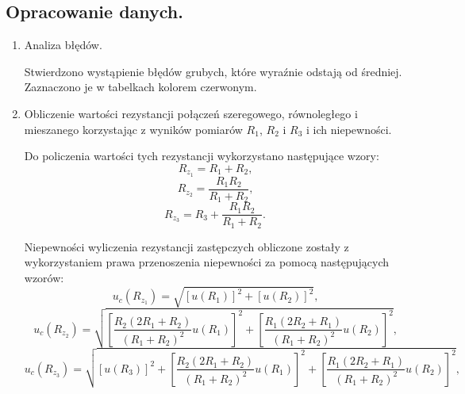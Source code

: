 \documentclass [a4paper,11pt]{article}
\begin{document}
	\subsection{Opracowanie danych.}\label{sec:drm}
	\begin{enumerate}[label=\alph*)]
		
		\item Analiza błędów.
		
		Stwierdzono wystąpienie błędów grubych, które wyraźnie odstają od średniej. Zaznaczono je w tabelkach kolorem czerwonym.
		
		\item Obliczenie wartości rezystancji połączeń szeregowego, równoległego i mieszanego korzystając z wyników pomiarów $R_1$, $R_2$ i $R_3$ i ich niepewności.
		
		Do policzenia wartości tych rezystancji wykorzystano następujące wzory: 
		\begin{equation}
		\label{eq:rz1}
		R_{z_1}=R_1 + R_2\text{,}
		\end{equation}
		\begin{equation}
		\label{eq:rz2}
		R_{z_2}=\frac{R_1 R_2}{R_1 + R_2}\text{,}
		\end{equation}
		\begin{equation}
		\label{eq:rz3}
		R_{z_3}=R_3 + \frac{R_1 R_2}{R_1 + R_2}\text{.}
		\end{equation}
		
		Niepewności wyliczenia rezystancji zastępczych obliczone zostały z wykorzystaniem prawa przenoszenia niepewności za pomocą następujących wzorów:
		\begin{equation}
		\label{eq:nrz1}
		u_c(R_{z_1})=\sqrt{\left[ u(R_1) \right]^2 + \left[ u(R_2) \right]^2}\text{,}
		\end{equation}
		\begin{equation}
		\label{eq:nrz2}
		u_c(R_{z_2})=\sqrt{\left[ \frac{R_2(2R_1+R_2)}{(R_1+R_2)^2} u(R_1) \right]^2 + \left[ \frac{R_1(2R_2+R_1)}{(R_1+R_2)^2} u(R_2) \right]^2}\text{,}
		\end{equation}
		\begin{equation}
		\label{eq:nrz3}
		u_c(R_{z_3})=\sqrt{\left[ u(R_3) \right]^2 + \left[ \frac{R_2(2R_1+R_2)}{(R_1+R_2)^2} u(R_1) \right]^2 + \left[ \frac{R_1(2R_2+R_1)}{(R_1+R_2)^2} u(R_2) \right]^2}\text{,}
		\end{equation}
		

\end{enumerate}
\end{document}
